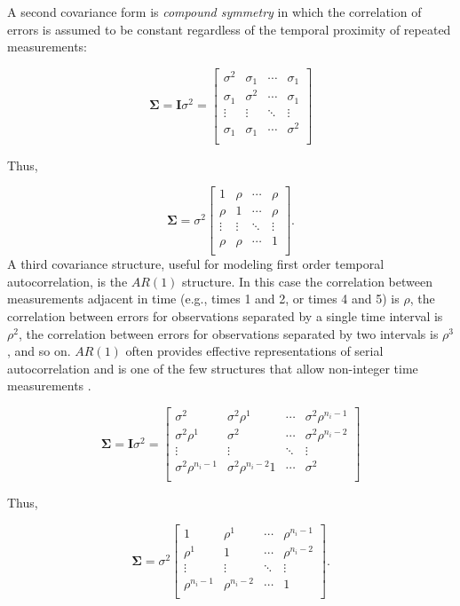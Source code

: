 \documentclass[12pt,english]{article}\usepackage[]{graphicx}\usepackage[table]{xcolor}
\begin{document}
A second covariance form is \textit{compound symmetry} in which the correlation of errors is assumed to be constant regardless of the temporal proximity of repeated measurements:

\[\boldsymbol{\Sigma} = \boldsymbol{I}\sigma^2 = \left[
 \begin{matrix}
  \sigma^2 & \sigma_1 & \cdots & \sigma_1 \\
  \sigma_1 & \sigma^2 & \cdots & \sigma_1 \\
  \vdots & \vdots & \ddots & \vdots  \\
  \sigma_1 & \sigma_1 & \cdots & \sigma^2  \\
 \end{matrix}
\right]
 \]

Thus,

\[\boldsymbol{\Sigma} = \sigma^2\left[
 \begin{matrix}
  1 &  \rho & \cdots &  \rho \\
  \rho & 1 & \cdots &  \rho \\
  \vdots & \vdots & \ddots & \vdots  \\
   \rho &  \rho & \cdots & 1  \\
 \end{matrix}
\right].
 \]
A third covariance structure, useful for modeling first order temporal autocorrelation, is the $AR(1)$ structure.  In this case the correlation between measurements adjacent in time (e.g., times 1 and 2, or times 4 and 5) is $\rho$, the correlation between errors for observations separated by a single time interval is $\rho^2$, the correlation between errors for observations separated by two intervals is $\rho^3$, and so on. $AR(1)$ often provides effective representations of serial autocorrelation and is one of the few structures that allow non-integer time measurements \citep{pinheiro2009}.

\[\boldsymbol{\Sigma} = \boldsymbol{I}\sigma^2 = \left[
 \begin{matrix}
  \sigma^2 & \sigma^2\rho^1 & \cdots & \sigma^2\rho^{n_i -1} \\
  \sigma^2\rho^1 & \sigma^2 & \cdots & \sigma^2\rho^{n_i -2} \\
  \vdots & \vdots & \ddots & \vdots  \\
  \sigma^2\rho^{n_i -1} & \sigma^2\rho^{n_i -2}1 & \cdots & \sigma^2  \\
 \end{matrix}
\right]
 \]

Thus,

\[\boldsymbol{\Sigma} = \sigma^2\left[
 \begin{matrix}
  1 &  \rho^1 & \cdots &  \rho^{n_i - 1} \\
  \rho^1 & 1 & \cdots &  \rho^{n_i - 2} \\
  \vdots & \vdots & \ddots & \vdots  \\
   \rho^{n_i - 1} &  \rho^{n_i - 2} & \cdots & 1  \\
 \end{matrix}
\right].
 \]
\end{document}
